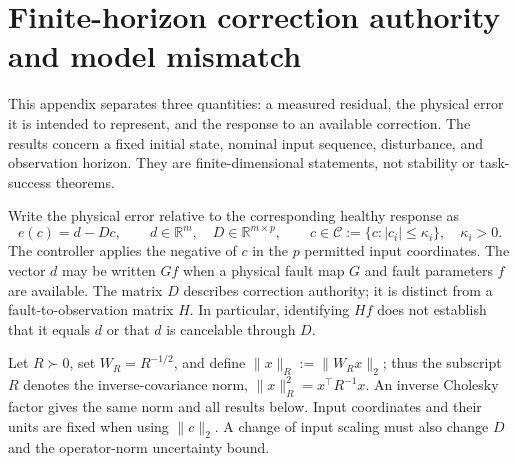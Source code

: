 
\section{Finite-horizon correction authority and model mismatch}
\label{app:authority}

This appendix separates three quantities: a measured residual, the physical
error it is intended to represent, and the response to an available correction.
The results concern a fixed initial state, nominal input sequence, disturbance,
and observation horizon. They are finite-dimensional statements, not stability
or task-success theorems.

Write the physical error relative to the corresponding healthy response as
\begin{equation}
 e(c)=d-Dc,\qquad d\in\mathbb R^m,\quad D\in\mathbb R^{m\times p},
 \qquad c\in\mathcal C:=\{c:|c_i|\leq\kappa_i\},\quad \kappa_i>0.
 \label{eq:authority-physical-map}
\end{equation}
The controller applies the negative of $c$ in the $p$ permitted input
coordinates. The vector $d$ may be written $Gf$ when a physical fault map $G$
and fault parameters $f$ are available. The matrix $D$ describes correction
authority; it is distinct from a fault-to-observation matrix $H$. In
particular, identifying $Hf$ does not establish that it equals $d$ or that
$d$ is cancelable through $D$.

Let $R\succ0$, set $W_R=R^{-1/2}$, and define
$\|x\|_R:=\|W_R x\|_2$; thus the subscript $R$ denotes the inverse-covariance
norm, $\|x\|_R^2=x^\top R^{-1}x$. An inverse Cholesky factor gives the same
norm and all results below. Input coordinates and their units are fixed when
using $\|c\|_2$. A change of input scaling must also change $D$ and the
operator-norm uncertainty bound.

